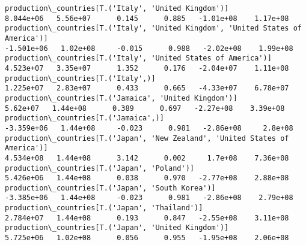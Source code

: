 \documentclass[11pt]{article}
\begin{document}
\begin{Verbatim}[commandchars=\\\{\}]
production\_countries[T.('Italy', 'United Kingdom')]                                                                                                                                    8.044e+06   5.56e+07      0.145      0.885   -1.01e+08    1.17e+08
production\_countries[T.('Italy', 'United Kingdom', 'United States of America')]                                                                                                       -1.501e+06   1.02e+08     -0.015      0.988   -2.02e+08    1.99e+08
production\_countries[T.('Italy', 'United States of America')]                                                                                                                          4.523e+07   3.35e+07      1.352      0.176   -2.04e+07    1.11e+08
production\_countries[T.('Italy',)]                                                                                                                                                     1.225e+07   2.83e+07      0.433      0.665   -4.33e+07    6.78e+07
production\_countries[T.('Jamaica', 'United Kingdom')]                                                                                                                                   5.62e+07   1.44e+08      0.389      0.697   -2.27e+08    3.39e+08
production\_countries[T.('Jamaica',)]                                                                                                                                                  -3.359e+06   1.44e+08     -0.023      0.981   -2.86e+08     2.8e+08
production\_countries[T.('Japan', 'New Zealand', 'United States of America')]                                                                                                           4.534e+08   1.44e+08      3.142      0.002     1.7e+08    7.36e+08
production\_countries[T.('Japan', 'Poland')]                                                                                                                                            5.426e+06   1.44e+08      0.038      0.970   -2.77e+08    2.88e+08
production\_countries[T.('Japan', 'South Korea')]                                                                                                                                      -3.385e+06   1.44e+08     -0.023      0.981   -2.86e+08    2.79e+08
production\_countries[T.('Japan', 'Thailand')]                                                                                                                                          2.784e+07   1.44e+08      0.193      0.847   -2.55e+08    3.11e+08
production\_countries[T.('Japan', 'United Kingdom')]                                                                                                                                    5.725e+06   1.02e+08      0.056      0.955   -1.95e+08    2.06e+08

\end{Verbatim}
\end{document}
